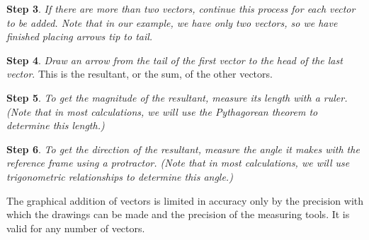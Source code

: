 \documentclass[main-ap-physics.tex]{subfiles}
\begin{document}
\textbf{Step 3}. \textit{If there are more than two vectors, continue this process for each vector to be added. Note that in our example, we have only two vectors, so we have finished placing arrows tip to tail.}

\vspace{1em}

\textbf{Step 4}. \textit{Draw an arrow from the tail of the first vector to the head of the last vector}. This is the resultant, or the sum, of the other vectors.

\begin{center}
\end{center}

\textbf{Step 5}. \textit{To get the magnitude of the resultant, measure its length with a ruler. (Note that in most calculations, we will use the Pythagorean theorem to determine this length.)}

\vspace{1em}

\textbf{Step 6}. \textit{To get the direction of the resultant, measure the angle it makes with the reference frame using a protractor. (Note that in most calculations, we will use trigonometric relationships to determine this angle.)}

\vspace{1em}

The graphical addition of vectors is limited in accuracy only by the precision with which the drawings can be made and the precision of the measuring tools. It is valid for any number of vectors.
\end{document}
